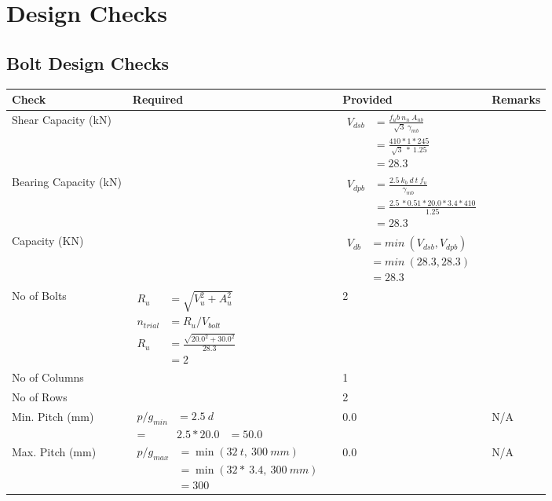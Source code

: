 \documentclass{article}%
\begin{document}
%
%
\section{Design Checks}%
\label{sec:DesignChecks}%
\subsection{Bolt Design Checks}%
\label{subsec:BoltDesignChecks}%
\renewcommand{\arraystretch}{1.2}%
\begin{longtable}{|p{4cm}|p{5cm}|p{5.5cm}|p{1.5cm}|}%
\hline%
\rowcolor{OsdagGreen}%
Check&Required&Provided&Remarks\\%
\hline%
\endhead%
\hline%
Shear Capacity (kN)&&$\begin{aligned}V_{dsb} &= \frac{f_ub ~n_n~ A_{nb}}{\sqrt{3} ~\gamma_{mb}}\\ &= \frac{410*1*245}{\sqrt{3}~*~1.25}\\ &= 28.3\end{aligned}$&\\%
\hline%
Bearing Capacity (kN)&&$\begin{aligned}V_{dpb} &= \frac{2.5~ k_b~ d~ t~ f_u}{\gamma_{mb}}\\ &= \frac{2.5~*0.51*20.0*3.4*410}{1.25}\\ &=28.3\end{aligned}$&\\%
\hline%
Capacity (KN)&&$\begin{aligned}V_{db} &= min~ (V_{dsb}, V_{dpb})\\ &= min~ (28.3,28.3)\\ &=28.3\end{aligned}$&\\%
\hline%
No of Bolts&$\begin{aligned}R_{u} &= \sqrt{V_u^2+A_u^2}\\ n_{trial} &= R_u/ V_{bolt}\\ R_{u} &= \frac{\sqrt{20.0^2+30.0^2}}{28.3}\\ &=2\end{aligned}$&2&\\%
\hline%
No of Columns&&1&\\%
\hline%
No of Rows&&2&\\%
\hline%
Min. Pitch (mm)&$\begin{aligned}p/g_{min}&= 2.5 ~ d&\\ =&2.5*20.0&=50.0\end{aligned}$&0.0&N/A\\%
\hline%
Max. Pitch (mm)&$\begin{aligned}p/g_{max} &=\min(32~t,~300~mm)&\\ &=\min(32 *~3.4,~ 300 ~mm)\\&=300\end{aligned}$&0.0&N/A\\%

\end{longtable}
\end{document}
